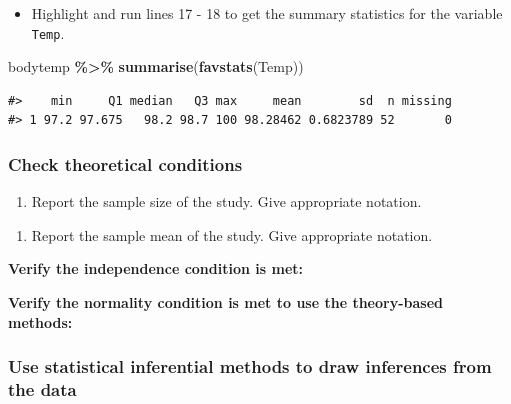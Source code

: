 \documentclass[
]{report}
\newenvironment{Shaded}{\begin{snugshade}}{\end{snugshade}}
\newcommand{\FunctionTok}[1]{\textcolor[rgb]{0.13,0.29,0.53}{\textbf{#1}}}
\newcommand{\NormalTok}[1]{#1}
\newcommand{\SpecialCharTok}[1]{\textcolor[rgb]{0.81,0.36,0.00}{\textbf{#1}}}
\providecommand{\tightlist}{%
  \setlength{\itemsep}{0pt}\setlength{\parskip}{0pt}}
\begin{document}
\begin{itemize}
\tightlist
\item
  Highlight and run lines 17 - 18 to get the summary statistics for the variable \texttt{Temp}.
\end{itemize}

\begin{Shaded}
\begin{Highlighting}[]
\NormalTok{bodytemp }\SpecialCharTok{\%\textgreater{}\%} 
  \FunctionTok{summarise}\NormalTok{(}\FunctionTok{favstats}\NormalTok{(Temp))}
\end{Highlighting}
\end{Shaded}

\begin{verbatim}
#>    min     Q1 median   Q3 max     mean        sd  n missing
#> 1 97.2 97.675   98.2 98.7 100 98.28462 0.6823789 52       0
\end{verbatim}

\subsubsection*{Check theoretical conditions}\label{check-theoretical-conditions}

\begin{enumerate}
\def\labelenumi{\arabic{enumi}.}
\setcounter{enumi}{2}
\tightlist
\item
  Report the sample size of the study. Give appropriate notation.
\end{enumerate}

\vspace{0.3in}

\begin{enumerate}
\def\labelenumi{\arabic{enumi}.}
\setcounter{enumi}{3}
\tightlist
\item
  Report the sample mean of the study. Give appropriate notation.
\end{enumerate}

\vspace{0.3in}

\textbf{Verify the independence condition is met:}
\vspace{0.8in}

\textbf{Verify the normality condition is met to use the theory-based methods:}
\vspace{1in}

\newpage

\subsubsection*{Use statistical inferential methods to draw inferences from the data}\label{use-statistical-inferential-methods-to-draw-inferences-from-the-data}
\end{document}
